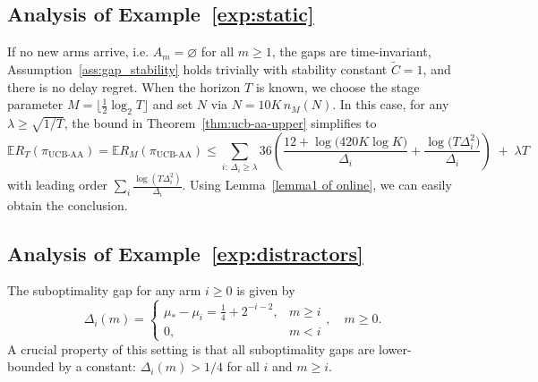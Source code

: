 \documentclass[
  12pt]{article}
\begin{document}
\subsection{Analysis of Example~\ref{exp:static}}\label{sec:Analysis of exp:static}
If no new
arms arrive, i.e. $A_m=\varnothing$ for all $m\ge 1$, the gaps are time-invariant, Assumption~\ref{ass:gap_stability} holds trivially with stability constant $\widetilde C=1$, and there is no delay regret. When the horizon $T$ is known, we choose the stage parameter $M=\lfloor \tfrac12\log_2 T\rfloor$ and set $N$ via $N=10K\,n_M(N)$.
In this case, for any $\lambda\ge \sqrt{1/T}$, the bound in Theorem~\ref{thm:ucb-aa-upper} simplifies to
\[
\mathbb{E}R_T(\pi_{\mathrm{UCB\text{-}AA}})=\mathbb{E}R_M(\pi_{\mathrm{UCB\text{-}AA}})
\le
\sum_{i:\,\Delta_i\ge \lambda}
36\left(\frac{12+ \log\bigl( 420K\log K \bigr)  }{\Delta_i}+\frac{\log\bigl( T \Delta_i^2\bigr)}{\Delta_i}\right)
\;+\;\lambda T
\]
with leading order
\(
\sum_i \frac{\log(T\Delta_i^2)}{\Delta_i}.
\)
Using Lemma~\ref{lemma1 of online}, we can easily obtain the conclusion.

\subsection{Analysis of Example~\ref{exp:distractors}}\label{sec:Analysis of exp:distractors}
The suboptimality gap for any arm $i \ge 0$ is given by 
\[\Delta_i(m)=\begin{cases}
    \mu_{*} - \mu_i = \frac{1}{4} + 2^{-i-2}, & m\geq i\\
    0,&m< i
\end{cases},\quad m\geq 0.\]
A crucial property of this setting is that all suboptimality gaps are lower-bounded by a constant: $\Delta_i(m) > 1/4$ for all $i$ and $m\geq i$.
\end{document}
